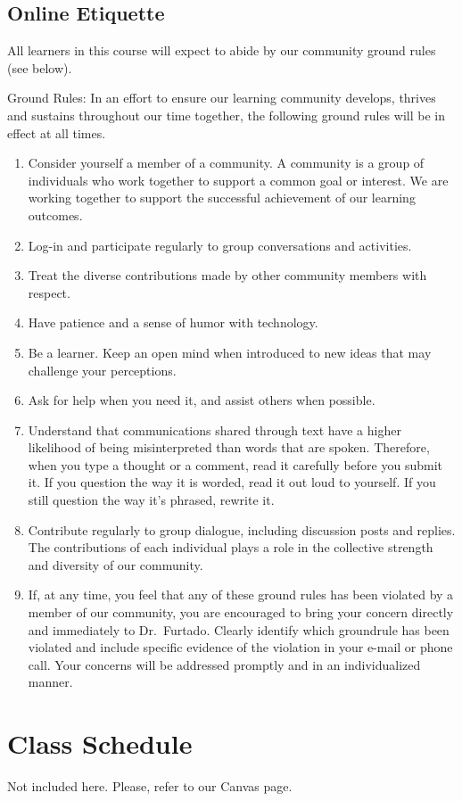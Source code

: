 \documentclass[11pt,]{article}
\providecommand{\tightlist}{%
  \setlength{\itemsep}{0pt}\setlength{\parskip}{0pt}}
\begin{document}
\hypertarget{online-etiquette}{%
\subsection{Online Etiquette}\label{online-etiquette}}

All learners in this course will expect to abide by our community ground
rules (see below).

Ground Rules: In an effort to ensure our learning community develops,
thrives and sustains throughout our time together, the following ground
rules will be in effect at all times.

\begin{enumerate}
\def\labelenumi{\arabic{enumi}.}
\tightlist
\item
  Consider yourself a member of a community. A community is a group of
  individuals who work together to support a common goal or interest. We
  are working together to support the successful achievement of our
  learning outcomes.
\item
  Log-in and participate regularly to group conversations and
  activities.
\item
  Treat the diverse contributions made by other community members with
  respect.
\item
  Have patience and a sense of humor with technology.
\item
  Be a learner. Keep an open mind when introduced to new ideas that may
  challenge your perceptions.
\item
  Ask for help when you need it, and assist others when possible.
\item
  Understand that communications shared through text have a higher
  likelihood of being misinterpreted than words that are spoken.
  Therefore, when you type a thought or a comment, read it carefully
  before you submit it. If you question the way it is worded, read it
  out loud to yourself. If you still question the way it's phrased,
  rewrite it.
\item
  Contribute regularly to group dialogue, including discussion posts and
  replies. The contributions of each individual plays a role in the
  collective strength and diversity of our community.
\item
  If, at any time, you feel that any of these ground rules has been
  violated by a member of our community, you are encouraged to bring
  your concern directly and immediately to Dr.~Furtado. Clearly identify
  which groundrule has been violated and include specific evidence of
  the violation in your e-mail or phone call. Your concerns will be
  addressed promptly and in an individualized manner.
\end{enumerate}

\hypertarget{class-schedule}{%
\section{Class Schedule}\label{class-schedule}}

Not included here. Please, refer to our Canvas page.
\end{document}
